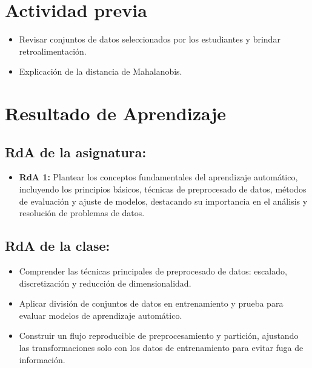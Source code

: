 \documentclass[a4,11pt]{aleph-notas}
\begin{document}
\encabezado

\section*{Actividad previa}

\begin{itemize}
    \item Revisar conjuntos de datos seleccionados por los estudiantes y brindar retroalimentación.
    \item Explicación de la distancia de Mahalanobis.
\end{itemize}

\section*{Resultado de Aprendizaje}

\subsection*{RdA de la asignatura:}
\begin{itemize}[leftmargin=*]
    \item \textbf{RdA 1:} Plantear los conceptos fundamentales del aprendizaje automático, incluyendo los principios básicos, técnicas de preprocesado de datos, métodos de evaluación y ajuste de modelos, destacando su importancia en el análisis y resolución de problemas de datos.
\end{itemize}

\subsection*{RdA de la clase:}
\begin{itemize}[leftmargin=*]
    \item Comprender las técnicas principales de preprocesado de datos: escalado, discretización y reducción de dimensionalidad.
    \item Aplicar división de conjuntos de datos en entrenamiento y prueba para evaluar modelos de aprendizaje automático.
    \item Construir un flujo reproducible de preprocesamiento y partición, ajustando las transformaciones solo con los datos de entrenamiento para evitar fuga de información.
\end{itemize}
\end{document}
